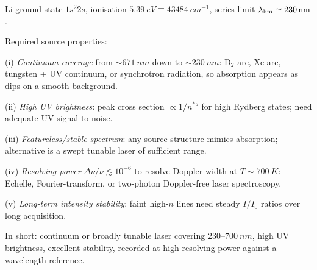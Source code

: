 \documentclass[11pt]{article}
\begin{document}
Li ground state $1s^{2}2s$, ionisation $\SI{5.39}{eV}\equiv\SI{43484}{cm^{-1}}$, series limit $\lambda_{\rm lim}\simeq\SI{230}{nm}$.

Required source properties:

(i) \textit{Continuum coverage} from $\sim\SI{671}{nm}$ down to $\sim\SI{230}{nm}$: D$_2$ arc, Xe arc, tungsten + UV continuum, or synchrotron radiation, so absorption appears as dips on a smooth background.

(ii) \textit{High UV brightness}: peak cross section $\propto 1/n^{*5}$ for high Rydberg states; need adequate UV signal-to-noise.

(iii) \textit{Featureless/stable spectrum}: any source structure mimics absorption; alternative is a swept tunable laser of sufficient range.

(iv) \textit{Resolving power} $\Delta\nu/\nu\lesssim 10^{-6}$ to resolve Doppler width at $T\sim\SI{700}{K}$: Echelle, Fourier-transform, or two-photon Doppler-free laser spectroscopy.

(v) \textit{Long-term intensity stability}: faint high-$n$ lines need steady $I/I_0$ ratios over long acquisition.

In short: continuum or broadly tunable laser covering $230\text{--}\SI{700}{nm}$, high UV brightness, excellent stability, recorded at high resolving power against a wavelength reference.
\end{document}
